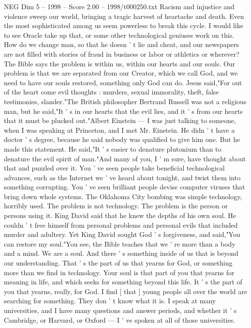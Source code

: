 \begin{textsample}{NEG Dim 5 – 1998 – Score 2.00 – 1998/t000250.txt}
Racism and injustice and violence sweep our world, bringing a tragic harvest of heartache and death.
Even the most sophisticated among us seem powerless to break this cycle.
I would like to see Oracle take up that, or some other technological geniuses work on this.
How do we change man, so that he doesn ' t lie and cheat, and our newspapers are not filled with stories of fraud in business or labor or athletics or wherever?
The Bible says the problem is within us, within our hearts and our souls.
Our problem is that we are separated from our Creator, which we call God, and we need to have our souls restored, something only God can do.
Jesus said,"For out of the heart come evil thoughts : murders, sexual immorality, theft, false testimonies, slander."The British philosopher Bertrand Russell was not a religious man, but he said,"It ' s in our hearts that the evil lies, and it ' s from our hearts that it must be plucked out."Albert Einstein — I was just talking to someone, when I was speaking at Princeton, and I met Mr.
Einstein.
He didn ' t have a doctor ' s degree, because he said nobody was qualified to give him one.
But he made this statement.
He said,"It ' s easier to denature plutonium than to denature the evil spirit of man."And many of you, I ' m sure, have thought about that and puzzled over it.
You ' ve seen people take beneficial technological advances, such as the Internet we ' ve heard about tonight, and twist them into something corrupting.
You ' ve seen brilliant people devise computer viruses that bring down whole systems.
The Oklahoma City bombing was simple technology, horribly used.
The problem is not technology.
The problem is the person or persons using it.
King David said that he knew the depths of his own soul.
He couldn ' t free himself from personal problems and personal evils that included murder and adultery.
Yet King David sought God ' s forgiveness, and said,"You can restore my soul."You see, the Bible teaches that we ' re more than a body and a mind.
We are a soul.
And there ' s something inside of us that is beyond our understanding.
That ' s the part of us that yearns for God, or something more than we find in technology.
Your soul is that part of you that yearns for meaning in life, and which seeks for something beyond this life.
It ' s the part of you that yearns, really, for God.
I find [ that ] young people all over the world are searching for something.
They don ' t know what it is.
I speak at many universities, and I have many questions and answer periods, and whether it ' s Cambridge, or Harvard, or Oxford — I ' ve spoken at all of those universities.

\end{textsample}
